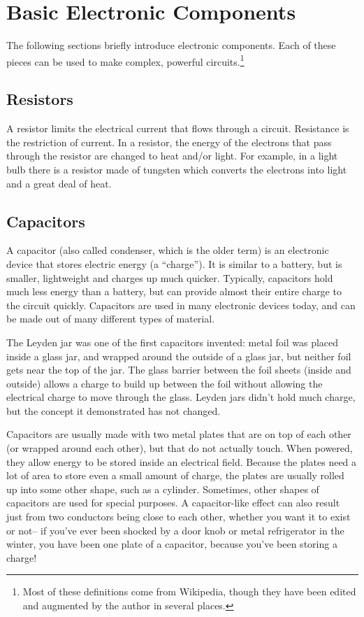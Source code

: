 \section{Basic Electronic Components}


The following sections briefly introduce electronic components. Each of these pieces can be used to make complex, powerful circuits.\footnote{Most of these definitions come from Wikipedia, though they have been edited and augmented by the author in several places.}

\subsection*{Resistors} 

A resistor limits the electrical current that flows through a circuit. Resistance is the restriction of current. In a resistor, the energy of the electrons that pass through the resistor are changed to heat and/or light. For example, in a light bulb there is a resistor made of tungsten which converts the electrons into light and a great deal of heat.

\subsection*{Capacitors}

A capacitor (also called condenser, which is the older term) is an electronic device that stores electric energy (a ``charge''). It is similar to a battery, but is smaller, lightweight and charges up much quicker. Typically, capacitors hold much less energy than a battery, but can provide almost their entire charge to the circuit quickly. Capacitors are used in many electronic devices today, and can be made out of many different types of material. 

The Leyden jar was one of the first capacitors invented: metal foil was placed inside a glass jar, and wrapped around the outside of a glass jar, but neither foil gets near the top of the jar. The glass barrier between the foil sheets (inside and outside) allows a charge to build up between the foil without allowing the electrical charge to move through the glass. Leyden jars didn't hold much charge, but the concept it demonstrated has not changed.

Capacitors are usually made with two metal plates that are on top of each other (or wrapped around each other), but that do not actually touch. When powered, they allow energy to be stored inside an electrical field. Because the plates need a lot of area to store even a small amount of charge, the plates are usually rolled up into some other shape, such as a cylinder. Sometimes, other shapes of capacitors are used for special purposes. A capacitor-like effect can also result just from two conductors being close to each other, whether you want it to exist or not-- if you've ever been shocked by a door knob or metal refrigerator in the winter, you have been one plate of a capacitor, because you've been storing a charge!

